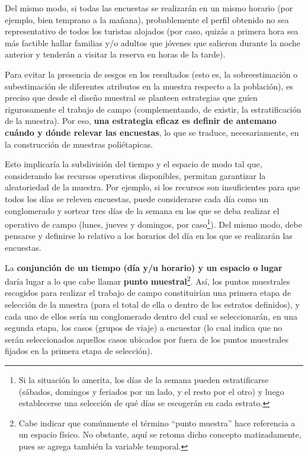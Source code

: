 \documentclass[
]{book}
\begin{document}
Del mismo modo, si todas las encuestas se realizarán en un mismo horario (por ejemplo, bien temprano a la mañana), probablemente el perfil obtenido no sea representativo de todos los turistas alojados (por caso, quizás a primera hora sea más factible hallar familias y/o adultos que jóvenes que salieron durante la noche anterior y tenderán a visitar la reserva en horas de la tarde).

Para evitar la presencia de sesgos en los resultados (esto es, la sobreestimación o subestimación de diferentes atributos en la muestra respecto a la población), es preciso que desde el diseño muestral se planteen estrategias que guíen rigurosamente el trabajo de campo (complementando, de existir, la estratificación de la muestra). Por eso, \textbf{una estrategia eficaz es definir de antemano cuándo y dónde relevar las encuestas}, lo que se traduce, necesariamente, en la construcción de muestras poliétapicas.

Esto implicaría la subdivisión del tiempo y el espacio de modo tal que, considerando los recursos operativos disponibles, permitan garantizar la aleatoriedad de la muestra. Por ejemplo, si los recursos son insuficientes para que todos los días se releven encuestas, puede considerarse cada día como un conglomerado y sortear tres días de la semana en los que se deba realizar el operativo de campo (lunes, jueves y domingos, por caso\footnote{Si la situación lo amerita, los días de la semana pueden estratificarse (sábados, domingos y feriados por un lado, y el resto por el otro) y luego establecerse una selección de qué días se escogerán en cada estrato.}). Del mismo modo, debe pensarse y definirse lo relativo a los horarios del día en los que se realizarán las encuestas.

La \textbf{conjunción de un tiempo (día y/u horario) y un espacio o lugar} daría lugar a lo que cabe llamar \textbf{punto muestral}\footnote{Cabe indicar que comúnmente el término ``punto muestra'' hace referencia a un espacio físico. No obstante, aquí se retoma dicho concepto matizadamente, pues se agrega también la variable temporal.}. Así, los puntos muestrales escogidos para realizar el trabajo de campo constituirían una primera etapa de selección de la muestra (para el total de ella o dentro de los estratos definidos), y cada uno de ellos sería un conglomerado dentro del cual se seleccionarán, en una segunda etapa, los casos (grupos de viaje) a encuestar (lo cual indica que no serán seleccionados aquellos casos ubicados por fuera de los puntos muestrales fijados en la primera etapa de selección).
\end{document}
